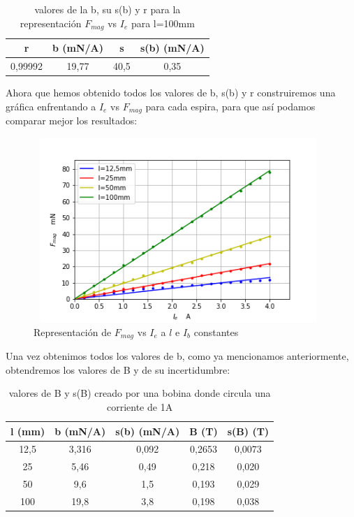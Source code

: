 \documentclass[12pt,a4paper]{book}
\begin{document}
\begin{table}[h!]
\begin{center}
\begin{tabular}{|c|c|c|c|}
\hline
r & 	 b  (mN/A) & 	 s & 	 s(b)  (mN/A) \\ \hline
0,99992 & 	 19,77 & 	 40,5 & 	 0,35 \\
\hline
\end{tabular}
\end{center}
\caption{valores de la b, su s(b) y r para la representación $F_{mag}$ vs $I_e$ para l=100mm}
\end{table}

\newpage

Ahora que hemos obtenido todos los valores de b, s(b) y r construiremos una gráfica enfrentando a $I_e$ vs $F_{mag}$ para cada espira, para que así podamos comparar mejor los resultados:

\begin{figure}[h!] %
\centering
\includegraphics[width=11cm, height=7cm]{Plot1-balanzaelectrodinamica.png}
\caption{Representación de $F_{mag}$ vs $I_e$ a $l$ e $I_b$ constantes}
\label{fig:Plot1-balanzaelectrodinamica}
\end{figure}

Una vez obtenimos todos los valores de b, como ya mencionamos anteriormente, obtendremos los valores de B y de su incertidumbre:

\begin{table}[h!]
\begin{center}
\begin{tabular}{|c|c|c|c|c|}
\hline
l  (mm) & 	 b    (mN/A) & 	 s(b)    (mN/A) & 	 B   (T) & 	 s(B)   (T) \\ \hline
12,5 & 	 3,316 & 	 0,092 & 	 0,2653 & 	 0,0073 \\ 
25 & 	 5,46 & 	 0,49 & 	 0,218 & 	 0,020 \\ 
50 & 	 9,6 & 	 1,5 & 	 0,193 & 	 0,029 \\ 
100 & 	 19,8 & 	 3,8 & 	 0,198 & 	 0,038 \\  \hline
\end{tabular}
\end{center}
\caption{valores de B y s(B) creado por una bobina donde circula una corriente de 1A }
\label{Tab:balanza-valor-B-Ie}
\end{table}
\end{document}

